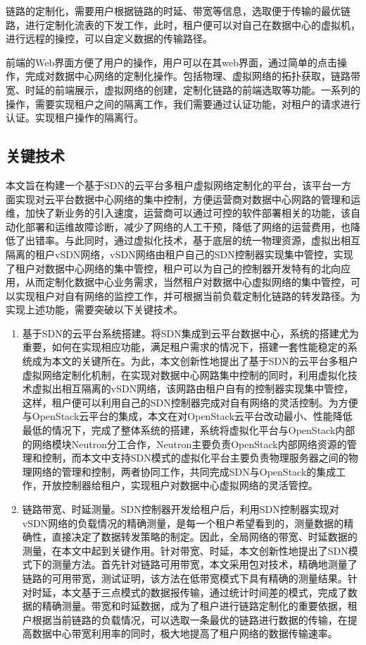链路的定制化，需要用户根据链路的时延、带宽等信息，选取便于传输的最优链路，进行定制化流表的下发工作，此时，租户便可以对自己在数据中心的虚拟机，进行远程的操控，可以自定义数据的传输路径。

前端的Web界面方便了用户的操作，用户可以在其web界面，通过简单的点击操作，完成对数据中心网络的定制化操作。包括物理、虚拟网络的拓扑获取，链路带宽、时延的前端展示，虚拟网络的创建，定制化链路的前端选取等功能。一系列的操作，需要实现租户之间的隔离工作，我们需要通过认证功能，对租户的请求进行认证。实现租户操作的隔离行。

\subsection{关键技术}
本文旨在构建一个基于SDN的云平台多租户虚拟网络定制化的平台，该平台一方面实现对云平台数据中心网络的集中控制，方便运营商对数据中心网路的管理和运维，加快了新业务的引入速度，运营商可以通过可控的软件部署相关的功能，该自动化部署和运维故障诊断，减少了网络的人工干预，降低了网络的运营费用，也降低了出错率。与此同时，通过虚拟化技术，基于底层的统一物理资源，虚拟出相互隔离的租户vSDN网络，vSDN网络由租户自己的SDN控制器实现集中管控，实现了租户对数据中心网络的集中管控，租户可以为自己的控制器开发特有的北向应用，从而定制化数据中心业务需求，当然租户对数据中心虚拟网络的集中管控，可以实现租户对自有网络的监控工作，并可根据当前负载定制化链路的转发路径。为实现上述功能，需要突破以下关键技术。

\begin{enumerate}
\item 基于SDN的云平台系统搭建。将SDN集成到云平台数据中心，系统的搭建尤为重要，如何在实现相应功能，满足租户需求的情况下，搭建一套性能稳定的系统成为本文的关键所在。为此，本文创新性地提出了基于SDN的云平台多租户虚拟网络定制化机制，在实现对数据中心网路集中控制的同时，利用虚拟化技术虚拟出相互隔离的vSDN网络，该网路由租户自有的控制器实现集中管控，这样，租户便可以利用自己的SDN控制器完成对自有网络的灵活控制。为方便与OpenStack云平台的集成，本文在对OpenStack云平台改动最小、性能降低最低的情况下，完成了整体系统的搭建，系统将虚拟化平台与OpenStack内部的网络模块Neutron分工合作，Neutron主要负责OpenStack内部网络资源的管理和控制，而本文中支持SDN模式的虚拟化平台主要负责物理服务器之间的物理网络的管理和控制，两者协同工作，共同完成SDN与OpenStack的集成工作，开放控制器给租户，实现租户对数据中心虚拟网络的灵活管控。
\item 链路带宽、时延测量。SDN控制器开发给租户后，利用SDN控制器实现对vSDN网络的负载情况的精确测量，是每一个租户希望看到的，测量数据的精确性，直接决定了数据转发策略的制定。因此，全局网络的带宽、时延数据的测量，在本文中起到关键作用。针对带宽、时延，本文创新性地提出了SDN模式下的测量方法。首先针对链路可用带宽，本文采用包对技术，精确地测量了链路的可用带宽，测试证明，该方法在低带宽模式下具有精确的测量结果。针对时延，本文基于三点模式的数据报传输，通过统计时间差的模式，完成了数据的精确测量。带宽和时延数据，成为了租户进行链路定制化的重要依据，租户根据当前链路的负载情况，可以选取一条最优的链路进行数据的传输，在提高数据中心带宽利用率的同时，极大地提高了租户网络的数据传输速率。
\end{enumerate}

